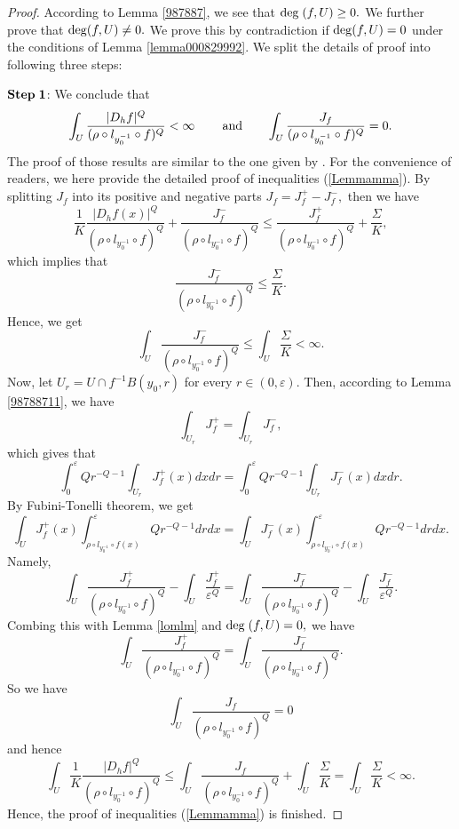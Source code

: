 \documentclass[11pt,twoside]{article}
\theoremstyle{definition}
\theoremstyle{remark}
\begin{document}
\begin{proof}
According to Lemma \ref{987887}, we see that ${\rm deg}\;(f,U)\geq0.$ We further prove that ${\rm deg}(f,U)\neq0.$ We prove this by contradiction if ${\rm deg}(f,U)=0$ under the conditions of Lemma \ref{lemma000829992}. We split the details of proof into following three steps: 

${\rm \mathbf{Step}\;\mathbf{1}}$:  We conclude that
\begin{equation}\label{Lemmamma}
\int_{U}\frac{\vert D_{h}f\vert^{Q}}{(\rho\circ l_{y_{0}^{-1}}\circ f)^{Q}}<\infty\;\;\;\;\;\;\;\;{\rm and }\;\;\;\;\;\;\;\int_{U}\frac{J_{f}}{(\rho\circ l_{y_{0}^{-1}}\circ f)^{Q}}=0.
\end{equation}
The proof of those results are similar to the one given by \cite[Lemma 4.3]{KO222}. For the convenience of readers, we here provide the detailed proof of inequalities (\ref{Lemmamma}). By splitting $J_{f}$ into its positive and negative parts $J_{f}=J_{f}^{+}-J_{f}^{-},$ then we have
$$\frac{1}{K}\frac{\vert D_{h}f(x)\vert^{Q}}{(\rho\circ l_{y_{0}^{-1}}\circ f)^{Q}}+\frac{J_{f}^{-}}{(\rho\circ l_{y_{0}^{-1}}\circ f)^{Q}}\leq \frac{J_{f}^{+}}{(\rho\circ l_{y_{0}^{-1}}\circ f)^{Q}}+\frac{\Sigma}{K},$$
which implies that 
$$\frac{J_{f}^{-}}{(\rho\circ l_{y_{0}^{-1}}\circ f)^{Q}}\leq \frac{\Sigma}{K}.$$
Hence, we get
$$\int_{U}\frac{J_{f}^{-}}{(\rho\circ l_{y_{0}^{-1}}\circ f)^{Q}}\leq \int_{U}\frac{\Sigma}{K}<\infty.$$
Now, let $U_{r}=U\cap f^{-1}B(y_{0},r)$ for every $r\in(0,\varepsilon).$ Then, according to Lemma \ref{98788711}, we have
$$\int_{U_{r}}J_{f}^{+}=\int_{U_{r}}J_{f}^{-},$$
which gives that 
$$\int_{0}^{\varepsilon}Qr^{-Q-1}\int_{U_{r}}J_{f}^{+}(x)dxdr=\int_{0}^{\varepsilon}Qr^{-Q-1}\int_{U_{r}}J_{f}^{-}(x)dxdr.$$
By Fubini-Tonelli theorem, we get
$$\int_{U}J_{f}^{+}(x)\int_{\rho\circ l_{y_{0}^{-1}}\circ f(x)}^{\varepsilon}Qr^{-Q-1}drdx=\int_{U}J_{f}^{-}(x)\int_{\rho\circ l_{y_{0}^{-1}}\circ f(x)}^{\varepsilon}Qr^{-Q-1}drdx.$$
Namely,
$$\int_{U}\frac{J_{f}^{+}}{(\rho\circ l_{y_{0}^{-1}}\circ f)^{Q}}-\int_{U}\frac{J_{f}^{+}}{\varepsilon^{Q}}=\int_{U}\frac{J_{f}^{-}}{(\rho\circ l_{y_{0}^{-1}}\circ f)^{Q}}-\int_{U}\frac{J_{f}^{-}}{\varepsilon^{Q}}.$$
Combing this with Lemma \ref{lomlm} and ${\rm deg}\;(f,U)=0,$ we have
$$\int_{U}\frac{J_{f}^{+}}{(\rho\circ l_{y_{0}^{-1}}\circ f)^{Q}}=\int_{U}\frac{J_{f}^{-}}{(\rho\circ l_{y_{0}^{-1}}\circ f)^{Q}}.$$
So we have
$$\int_{U}\frac{J_{f}}{(\rho\circ l_{y_{0}^{-1}}\circ f)^{Q}}=0$$
and hence 
\begin{equation}\label{00001010101010190091}
\int_{U}\frac{1}{K}\frac{\vert D_{h}f\vert^{Q}}{(\rho\circ l_{y_{0}^{-1}}\circ f)^{Q}}\leq \int_{U}\frac{J_{f}}{(\rho\circ l_{y_{0}^{-1}}\circ f)^{Q}}+\int_{U}\frac{\Sigma}{K}=\int_{U}\frac{\Sigma}{K}<\infty.
\end{equation}
Hence, the proof of inequalities (\ref{Lemmamma}) is finished.  



\end{proof}
\end{document}
